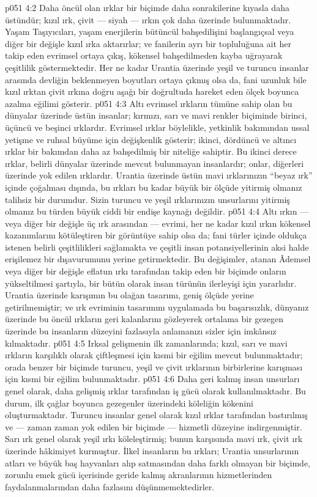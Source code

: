 \vs p051 4:2 Daha öncül olan ırklar bir biçimde daha sonrakilerine kıyasla daha üstündür; kızıl ırk, çivit --- siyah --- ırkın çok daha üzerinde bulunmaktadır. Yaşam Taşıyıcıları, yaşam enerjilerin bütüncül bahşedilişini başlangıçsal veya diğer bir değişle kızıl ırka aktarırlar; ve fanilerin ayrı bir topluluğuna ait her takip eden evrimsel ortaya çıkış, kökensel bahşedilmeden kayba uğrayarak çeşitlilik göstermektedir. Her ne kadar Urantia üzerinde yeşil ve turuncu insanlar arasında devliğin beklenmeyen boyutları ortaya çıkmış olsa da, fani uzunluk bile kızıl ırktan çivit ırkına doğru aşağı bir doğrultuda hareket eden ölçek boyunca azalma eğilimi gösterir.
\vs p051 4:3 Altı evrimsel ırkların tümüne sahip olan bu dünyalar üzerinde üstün insanlar; kırmızı, sarı ve mavi renkler biçiminde birinci, üçüncü ve beşinci ırklardır. Evrimsel ırklar böylelikle, yetkinlik bakımından ussal yetişme ve ruhsal büyüme için değişkenlik gösterir; ikinci, dördüncü ve altıncı ırklar bir bakımdan daha az bahşedilmiş bir niteliğe sahiptir. Bu ikinci derece ırklar, belirli dünyalar üzerinde mevcut bulunmayan insanlardır; onlar, diğerleri üzerinde yok edilen ırklardır. Urantia üzerinde üstün mavi ırklarınızın “beyaz ırk” içinde çoğalması dışında, bu ırkları bu kadar büyük bir ölçüde yitirmiş olmanız talihsiz bir durumdur. Sizin turuncu ve yeşil ırklarınızın unsurlarını yitirmiş olmanız bu türden büyük ciddi bir endişe kaynağı değildir.
\vs p051 4:4 Altı ırkın --- veya diğer bir değişle üç ırk arasından --- evrimi, her ne kadar kızıl ırkın kökensel kazanımlarını kötüleştiren bir görüntüye sahip olsa da; fani türler içinde oldukça istenen belirli çeşitlilikleri sağlamakta ve çeşitli insan potansiyellerinin aksi halde erişilemez bir dışavurumunu yerine getirmektedir. Bu değişimler, atanan Âdemsel veya diğer bir değişle eflatun ırkı tarafından takip eden bir biçimde onların yükseltilmesi şartıyla, bir bütün olarak insan türünün ilerleyişi için yararlıdır. Urantia üzerinde karışımın bu olağan tasarımı, geniş ölçüde yerine getirilmemiştir; ve ırk evriminin tasarımını uygulamada bu başarısızlık, dünyanız üzerinde bu öncül ırkların geri kalanlarını gözleyerek ortalama bir gezegen üzerinde bu insanların düzeyini fazlasıyla anlamanızı sizler için imkânsız kılmaktadır.
\vs p051 4:5 Irksal gelişmenin ilk zamanlarında; kızıl, sarı ve mavi ırkların karşılıklı olarak çiftleşmesi için kısmi bir eğilim mevcut bulunmaktadır; orada benzer bir biçimde turuncu, yeşil ve çivit ırklarının birbirlerine karışması için kısmi bir eğilim bulunmaktadır.
\vs p051 4:6 Daha geri kalmış insan unsurları genel olarak, daha gelişmiş ırklar tarafından iş gücü olarak kullanılmaktadır. Bu durum, ilk çağlar boyunca gezegenler üzerindeki köleliğin kökenini oluşturmaktadır. Turuncu insanlar genel olarak kızıl ırklar tarafından bastırılmış ve --- zaman zaman yok edilen bir biçimde --- hizmetli düzeyine indirgenmiştir. Sarı ırk genel olarak yeşil ırkı köleleştirmiş; bunun karşısında mavi ırk, çivit ırk üzerinde hâkimiyet kurmuştur. İlkel insanların bu ırkları; Urantia unsurlarının atları ve büyük baş hayvanları alıp satmasından daha farklı olmayan bir biçimde, zorunlu emek gücü içerisinde geride kalmış akranlarının hizmetlerinden faydalanmalarından daha fazlasını düşünmemektedirler.
